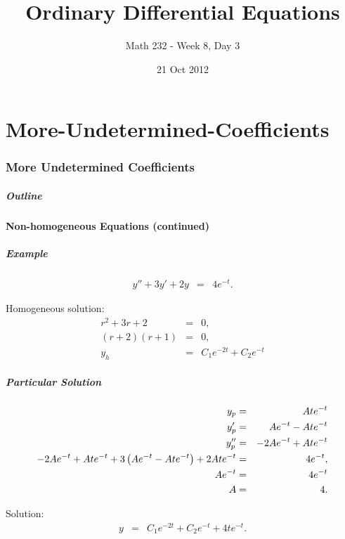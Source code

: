 \part{More-Undetermined-Coefficients}
\section{More Undetermined Coefficients}

\title{Ordinary Differential Equations}
\subtitle{Math 232 - Week 8, Day 3}
\date{21 Oct 2012}

\begin{frame}
  \titlepage
\end{frame}

\begin{frame}
  \frametitle{Outline}
\end{frame}


\subsection{Non-homogeneous Equations (continued)}


\begin{frame}
  \frametitle{Example}

  \begin{eqnarray*}
    y'' + 3y' + 2y & = & 4 e^{-t}.
  \end{eqnarray*}

  {
    Homogeneous solution:
    \begin{eqnarray*}
      r^2 + 3r + 2 & = & 0, \\
      (r+2)(r+1) & = & 0, \\
      y_h & = & C_1 e^{-2t} + C_2 e^{-t}
    \end{eqnarray*}
  }

\end{frame}

\begin{frame}
  \frametitle{Particular Solution}

  \begin{eqnarray*}
    y_p & = & A t e^{-t} \\
    y_p' & = & A e^{-t} - Ate^{-t} \\
    y_p'' & = & -2A e^{-t} + At e^{-t} \\
    -2A e^{-t} + At e^{-t} + 3 \left( A e^{-t} - Ate^{-t} \right) 
    + 2 A t e^{-t} & = & 4 e^{-t}, \\
    A e^{-t} & = & 4 e^{-t} \\
    A & = & 4.
  \end{eqnarray*}

  Solution:
  \begin{eqnarray*}
    y & = & C_1 e^{-2t} + C_2 e^{-t} + 4 t e^{-t}.
  \end{eqnarray*}

\end{frame}


